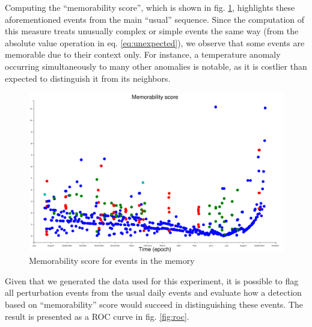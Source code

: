 \documentclass[conference]{IEEEtran}
\begin{document}
Computing the ``memorability score'', which is shown in fig. \ref{fig:result1},
highlights these aforementioned events from the main ``usual'' sequence. Since
the computation of this measure treats unusually complex or simple events the
same way (from the absolute value operation in eq. \ref{eq:unexpected}), we
observe that some events are memorable due to their context only. For instance,
a temperature anomaly occurring simultaneously to many other anomalies is
notable, as it is costlier than expected to distinguish it from its neighbors.

\begin{figure}[ht]
  \centering
  \includegraphics[width=\linewidth]{figures/complexities_surprises}
  \caption{Memorability score for events in the memory}
  \label{fig:result1}
\end{figure}

Given that we generated the data used for this experiment, it is possible to
flag all perturbation events from the usual daily events and evaluate how a
detection based on ``memorability'' score would succeed in distinguishing these
events. The result is presented as a ROC curve in fig. \ref{fig:roc}.
\end{document}
